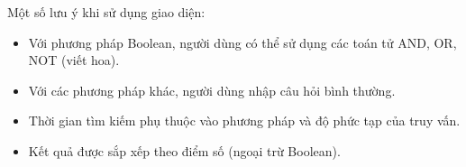 \documentclass[../BTL.tex]{subfiles}
\begin{document}
Một số lưu ý khi sử dụng giao diện:
\begin{itemize}
    \item Với phương pháp Boolean, người dùng có thể sử dụng các toán tử AND, OR, NOT (viết hoa).
    \item Với các phương pháp khác, người dùng nhập câu hỏi bình thường.
    \item Thời gian tìm kiếm phụ thuộc vào phương pháp và độ phức tạp của truy vấn.
    \item Kết quả được sắp xếp theo điểm số (ngoại trừ Boolean).
\end{itemize}
\end{document}
